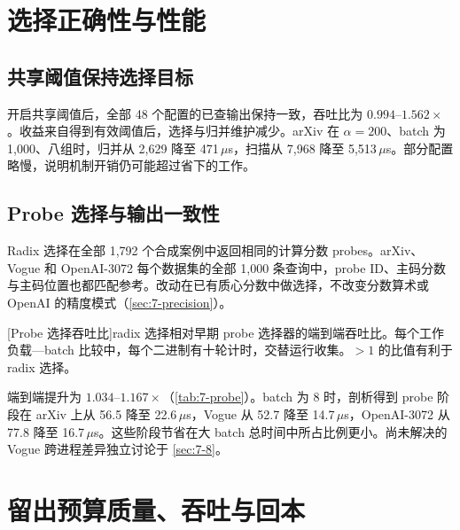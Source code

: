 \section{选择正确性与性能}
\label{sec:7-4}




\subsection{共享阈值保持选择目标}

开启共享阈值后，全部 48 个配置的已查输出保持一致，吞吐比为 $0.994$--$1.562\times$。收益来自得到有效阈值后，选择与归并维护减少。arXiv 在 $\alpha=200$、batch 为 1,000、八组时，归并从 2,629 降至 471\,$\mu$s，扫描从 7,968 降至 5,513\,$\mu$s。部分配置略慢，说明机制开销仍可能超过省下的工作。

\subsection{Probe 选择与输出一致性}

Radix 选择在全部 1,792 个合成案例中返回相同的计算分数 probes。arXiv、Vogue 和 OpenAI-3072 每个数据集的全部 1,000 条查询中，probe ID、主码分数与主码位置也都匹配参考。改动在已有质心分数中做选择，不改变分数算术或 OpenAI 的精度模式（\cref{sec:7-precision}）。

\par\medskip\noindent\begin{minipage}{\linewidth}
\captionsetup{hypcap=false}
\centering
{}[Probe 选择吞吐比]{radix 选择相对早期 probe 选择器的端到端吞吐比。每个工作负载—batch 比较中，每个二进制有十轮计时，交替运行收集。$>1$ 的比值有利于 radix 选择。}
\label{tab:7-probe}
\small

\end{minipage}\par\medskip

端到端提升为 $1.034$--$1.167\times$（\cref{tab:7-probe}）。batch 为 8 时，剖析得到 probe 阶段在 arXiv 上从 56.5 降至 22.6\,$\mu$s，Vogue 从 52.7 降至 14.7\,$\mu$s，OpenAI-3072 从 77.8 降至 16.7\,$\mu$s。这些阶段节省在大 batch 总时间中所占比例更小。尚未解决的 Vogue 跨进程差异独立讨论于 \cref{sec:7-8}。

\section{留出预算质量、吞吐与回本}
\label{sec:7-5}

